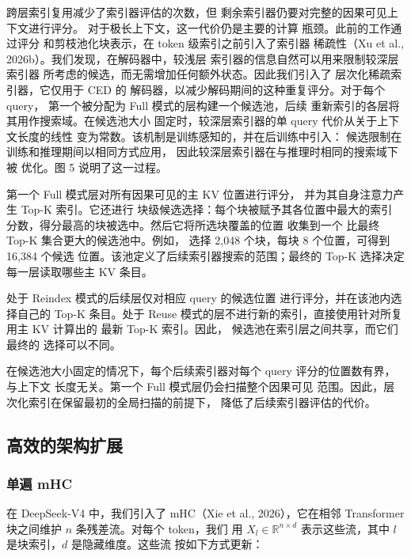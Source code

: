 \documentclass[
  10
]{article}
\begin{document}
跨层索引复用减少了索引器评估的次数，但
剩余索引器仍要对完整的因果可见上下文进行评分。
对于极长上下文，这一代价仍是主要的计算
瓶颈。此前的工作通过评分
和剪枝池化块表示，在 token 级索引之前引入了索引器
稀疏性（Xu et al., 2026b）。我们发现，在解码器中，较浅层
索引器的信息自然可以用来限制较深层索引器
所考虑的候选，而无需增加任何额外状态。因此我们引入了
层次化稀疏索引器，它仅用于 CED 的
解码器，以减少解码期间的这种重复评分。对于每个 query，
第一个被分配为 Full 模式的层构建一个候选池，后续
重新索引的各层将其用作搜索域。在候选池大小
固定时，较深层索引器的单 query 代价从关于上下文长度的线性
变为常数。该机制是训练感知的，并在后训练中引入：
候选限制在训练和推理期间以相同方式应用，
因此较深层索引器在与推理时相同的搜索域下被
优化。图 5
说明了这一过程。





第一个 Full 模式层对所有因果可见的主 KV 位置进行评分，
并为其自身注意力产生 Top-K 索引。它还进行
块级候选选择：每个块被赋予其各位置中最大的索引
分数，得分最高的块被选中。然后它将所选块覆盖的位置
收集到一个
比最终 Top-K 集合更大的候选池中。例如，
选择 2,048 个块，每块 8 个位置，可得到 16,384 个候选
位置。该池定义了后续索引器搜索的范围；最终的
Top-K 选择决定每一层读取哪些主 KV 条目。

处于 Reindex 模式的后续层仅对相应 query 的候选位置
进行评分，并在该池内选择自己的 Top-K 条目。处于 Reuse
模式的层不进行新的索引，直接使用针对所复用主 KV 计算出的
最新 Top-K 索引。因此，
候选池在索引层之间共享，而它们最终的
选择可以不同。

在候选池大小固定的情况下，每个后续索引器对每个
query 评分的位置数有界，与上下文
长度无关。第一个 Full 模式层仍会扫描整个因果可见
范围。因此，层次化索引在保留最初的全局扫描的前提下，
降低了后续索引器评估的代价。

\subsection{高效的架构扩展}\label{efficient-architectural-extensions}

\subsubsection{单遍 mHC}\label{single-pass-mhc}

在 DeepSeek-V4 中，我们引入了 mHC（Xie et al., 2026），它在相邻 Transformer
块之间维护 $n$ 条残差流。对每个 token，我们
用 \(X _ { l } \in \mathbb { R } ^ { n \times d }\)
表示这些流，其中 $l$ 是块索引，$d$ 是隐藏维度。这些流
按如下方式更新：
\end{document}
